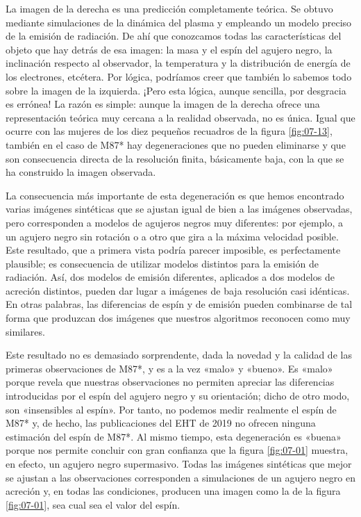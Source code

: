 La imagen de la derecha es una predicción completamente teórica. Se obtuvo mediante simulaciones de la dinámica del plasma y empleando un modelo preciso de la emisión de radiación. De ahí que conozcamos todas las características del objeto que hay detrás de esa imagen: la masa y el espín del agujero negro, la inclinación respecto al observador, la temperatura y la distribución de energía de los electrones, etcétera. Por lógica, podríamos creer que también lo sabemos todo sobre la imagen de la izquierda. ¡Pero esta lógica, aunque sencilla, por desgracia es errónea! La razón es simple: aunque la imagen de la derecha ofrece una representación teórica muy cercana a la realidad observada, no es única. Igual que ocurre con las mujeres de los diez pequeños recuadros de la figura \ref{fig:07-13}, también en el caso de M87* hay degeneraciones que no pueden eliminarse y que son consecuencia directa de la resolución finita, básicamente baja, con la que se ha construido la imagen observada.

La consecuencia más importante de esta degeneración es que hemos encontrado varias imágenes sintéticas que se ajustan igual de bien a las imágenes observadas, pero corresponden a modelos de agujeros negros muy diferentes: por ejemplo, a un agujero negro sin rotación o a otro que gira a la máxima velocidad posible. Este resultado, que a primera vista podría parecer imposible, es perfectamente plausible; es consecuencia de utilizar modelos distintos para la emisión de radiación. Así, dos modelos de emisión diferentes, aplicados a dos modelos de acreción distintos, pueden dar lugar a imágenes de baja resolución casi idénticas. En otras palabras, las diferencias de espín y de emisión pueden combinarse de tal forma que produzcan dos imágenes que nuestros algoritmos reconocen como muy similares.

Este resultado no es demasiado sorprendente, dada la novedad y la calidad de las primeras observaciones de M87*, y es a la vez «malo» y «bueno». Es «malo» porque revela que nuestras observaciones no permiten apreciar las diferencias introducidas por el espín del agujero negro y su orientación; dicho de otro modo, son «insensibles al espín». Por tanto, no podemos medir realmente el espín de M87* y, de hecho, las publicaciones del EHT de 2019 no ofrecen ninguna estimación del espín de M87*. Al mismo tiempo, esta degeneración es «buena» porque nos permite concluir con gran confianza que la figura \ref{fig:07-01} muestra, en efecto, un agujero negro supermasivo. Todas las imágenes sintéticas que mejor se ajustan a las observaciones corresponden a simulaciones de un agujero negro en acreción y, en todas las condiciones, producen una imagen como la de la figura \ref{fig:07-01}, sea cual sea el valor del espín.

